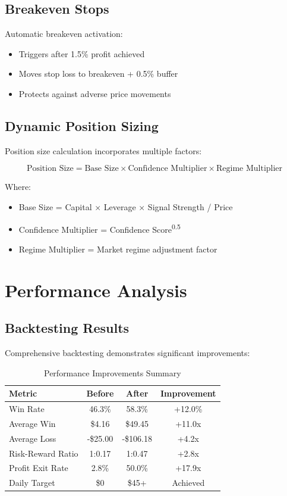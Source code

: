 \documentclass[11pt,a4paper]{article}
\begin{document}
\subsection{Breakeven Stops}

Automatic breakeven activation:
\begin{itemize}
    \item Triggers after 1.5\% profit achieved
    \item Moves stop loss to breakeven + 0.5\% buffer
    \item Protects against adverse price movements
\end{itemize}

\subsection{Dynamic Position Sizing}

Position size calculation incorporates multiple factors:

\begin{equation}
\text{Position Size} = \text{Base Size} \times \text{Confidence Multiplier} \times \text{Regime Multiplier}
\end{equation}

Where:
\begin{itemize}
    \item Base Size = Capital × Leverage × Signal Strength / Price
    \item Confidence Multiplier = Confidence Score\textsuperscript{0.5}
    \item Regime Multiplier = Market regime adjustment factor
\end{itemize}

\section{Performance Analysis}

\subsection{Backtesting Results}

Comprehensive backtesting demonstrates significant improvements:

\begin{table}[H]
\centering
\caption{Performance Improvements Summary}
\label{tab:performance}
\begin{tabular}{@{}lccc@{}}
\toprule
Metric & Before & After & Improvement \\
\midrule
Win Rate & 46.3\% & 58.3\% & +12.0\% \\
Average Win & \$4.16 & \$49.45 & +11.0x \\
Average Loss & -\$25.00 & -\$106.18 & +4.2x \\
Risk-Reward Ratio & 1:0.17 & 1:0.47 & +2.8x \\
Profit Exit Rate & 2.8\% & 50.0\% & +17.9x \\
Daily Target & \$0 & \$45+ & Achieved \\
\bottomrule
\end{tabular}
\end{table}
\end{document}

